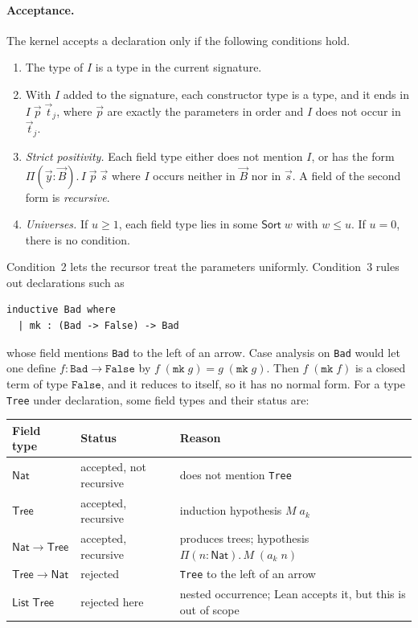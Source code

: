 \documentclass[acmsmall,screen,nonacm]{acmart}
\newcommand{\Sort}[1]{\mathsf{Sort}\;#1}
\newcommand{\tPi}[3]{\Pi(#1{:}#2).\,#3}
\newcommand{\Nat}{\mathsf{Nat}}
\begin{document}
\paragraph{Acceptance.}
The kernel accepts a declaration only if the following conditions hold.
\begin{enumerate}
  \item The type of $I$ is a type in the current signature.
  \item With $I$ added to the signature, each constructor type is a type, and it ends in $I\;\vec{p}\;\vec{t}_j$, where $\vec{p}$ are exactly the parameters in order and $I$ does not occur in $\vec{t}_j$.
  \item \emph{Strict positivity.} Each field type either does not mention $I$, or has the form $\tPi{\vec{y}}{\vec{B}}{I\;\vec{p}\;\vec{s}}$ where $I$ occurs neither in $\vec{B}$ nor in $\vec{s}$.
    A field of the second form is \emph{recursive}.
  \item \emph{Universes.} If $u \ge 1$, each field type lies in some $\Sort{w}$ with $w \le u$. If $u = 0$, there is no condition.
\end{enumerate}
Condition~2 lets the recursor treat the parameters uniformly.
Condition~3 rules out declarations such as
\begin{lstlisting}[numbers=none, columns=fullflexible, keepspaces=true]
inductive Bad where
  | mk : (Bad -> False) -> Bad
\end{lstlisting}
whose field mentions \texttt{Bad} to the left of an arrow.
Case analysis on \texttt{Bad} would let one define $f : \mathtt{Bad} \to \mathtt{False}$ by $f\;(\mathtt{mk}\;g) = g\;(\mathtt{mk}\;g)$.
Then $f\;(\mathtt{mk}\;f)$ is a closed term of type $\mathtt{False}$, and it reduces to itself, so it has no normal form.
For a type \texttt{Tree} under declaration, some field types and their status are:
\begin{center}
\footnotesize
\begin{tabular}{@{}lll@{}}
\toprule
\textbf{Field type} & \textbf{Status} & \textbf{Reason} \\
\midrule
$\Nat$ & accepted, not recursive & does not mention \texttt{Tree} \\
$\mathsf{Tree}$ & accepted, recursive & induction hypothesis $M\;a_k$ \\
$\Nat \to \mathsf{Tree}$ & accepted, recursive & produces trees; hypothesis $\tPi{n}{\Nat}{M\;(a_k\;n)}$ \\
$\mathsf{Tree} \to \Nat$ & rejected & \texttt{Tree} to the left of an arrow \\
$\mathsf{List}\;\mathsf{Tree}$ & rejected here & nested occurrence; Lean accepts it, but this is out of scope \\
\bottomrule
\end{tabular}
\end{center}
\end{document}
